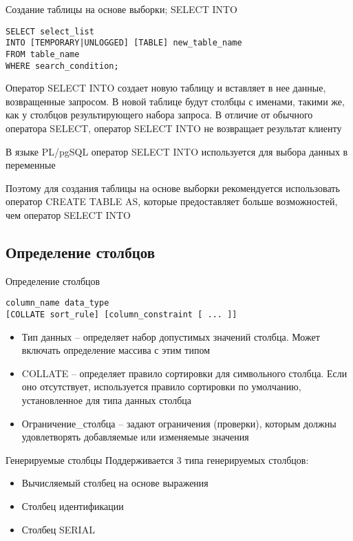 \documentclass[12pt]{article}
\begin{document}
\begin{defin}{Создание таблицы на основе выборки; SELECT INTO}
\begin{lstlisting}
SELECT select_list
INTO [TEMPORARY|UNLOGGED] [TABLE] new_table_name
FROM table_name 
WHERE search_condition;
\end{lstlisting}

    Оператор SELECT INTO создает новую таблицу и вставляет в нее данные, возвращенные запросом. В новой таблице будут столбцы с именами, такими же, как у столбцов результирующего набора запроса. В отличие от обычного оператора SELECT, оператор SELECT INTO не возвращает результат клиенту
\end{defin}

\begin{Remark}{}
    В языке PL/pgSQL оператор SELECT INTO используется для выбора данных в переменные 

    Поэтому для создания таблицы на основе выборки рекомендуется использовать оператор CREATE TABLE AS, которые предоставляет больше возможностей, чем оператор SELECT INTO
\end{Remark}

\newpage 

\subsection{Определение столбцов}

\begin{defin}{Определение столбцов}
\begin{lstlisting}
column_name data_type
[COLLATE sort_rule] [column_constraint [ ... ]]
\end{lstlisting}

    \begin{itemize}
        \item Тип данных -- определяет набор допустимых значений столбца. Может включать определение массива с этим типом
        \item COLLATE -- определяет правило сортировки для символьного столбца. Если оно отсутствует, используется правило сортировки по умолчанию, установленное для типа данных столбца 
        \item Ограничение\_столбца -- задают ограничения (проверки), которым должны удовлетворять добавляемые или изменяемые значения 
    \end{itemize}
\end{defin}

\begin{defin}{Генерируемые столбцы}
    Поддерживается 3 типа генерируемых столбцов:

    \begin{itemize}
        \item Вычисляемый столбец на основе выражения 
        \item Столбец идентификации 
        \item Столбец SERIAL 
    \end{itemize}
\end{defin}
\end{document}
